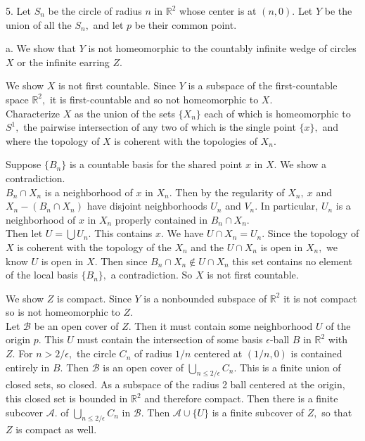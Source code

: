 \documentclass{article}
\begin{document}
5. Let $S_n$ be the circle of radius $n$ in $\mathbb{R}^2$ whose center is at $(n,0).$  Let $Y$ be the union of all the $S_n,$ and let $p$ be their common point.

a. We show that $Y$ is not homeomorphic to the countably infinite wedge of circles $X$ or the infinite earring $Z.$

We show $X$ is not first countable.  Since $Y$ is a subspace of the first-countable space $\mathbb{R}^2,$ it is first-countable and so not homeomorphic to $X.$
\\
Characterize $X$ as the union of the sets $\{X_n\}$ each of which is homeomorphic to $S^1,$ the pairwise intersection of any two of which is the single point $\{x\},$ and where the topology of $X$ is coherent with the topologies of $X_n.$

Suppose $\{B_n\}$ is a countable basis for the shared point $x$ in $X.$  We show a contradiction.
\\
$B_n\cap X_n$ is a neighborhood of $x$ in $X_n.$  Then by the regularity of $X_n,\ x$ and $X_n-(B_n\cap X_n)$ have disjoint neighborhoods $U_n$ and $V_n.$  In particular, $U_n$ is a neighborhood of $x$ in $X_n$ properly contained in $B_n\cap X_n.$
\\
Then let $U=\bigcup U_n.$  This contains $x.$ We have $U\cap X_n=U_n.$  Since the topology of $X$ is coherent with the topology of the $X_n$ and the $U\cap X_n$ is open in $X_n,$ we know $U$ is open in $X.$  Then since $B_n\cap X_n\notin U\cap X_n$ this set contains no element of the local basis $\{B_n\},$ a contradiction.  So $X$ is not first countable.

We show $Z$ is compact.  Since $Y$ is a nonbounded subspace of $\mathbb{R}^2$ it is not compact so is not homeomorphic to $Z.$
\\
Let $\mathscr{B}$ be an open cover of $Z.$  Then it must contain some neighborhood $U$ of the origin $p.$  This $U$ must contain the intersection of some basis $\epsilon$-ball $B$ in $\mathbb{R}^2$ with $Z.$  For $n>2/\epsilon,$ the circle $C_n$ of radius $1/n$ centered at $(1/n,0)$ is contained entirely in $B.$  Then $\mathscr{B}$ is an open cover of $\bigcup_{n\le 2/\epsilon} C_n.$  This is a finite union of closed sets, so closed.  As a subspace of the radius 2 ball centered at the origin, this closed set is bounded in $\mathbb{R}^2$ and therefore compact.  Then there is a finite subcover $\mathscr{A}.$ of $\bigcup_{n\le 2/\epsilon} C_n$ in $\mathscr{B}.$  Then $\mathscr{A}\cup\{U\}$ is a finite subcover of $Z,$ so that $Z$ is compact as well.
\end{document}
